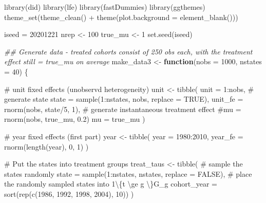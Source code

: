 \documentclass[
  letterpaper,
  DIV=11,
  numbers=noendperiod]{scrartcl}
\newenvironment{Shaded}{\begin{snugshade}}{\end{snugshade}}
\newcommand{\AttributeTok}[1]{\textcolor[rgb]{0.40,0.45,0.13}{#1}}
\newcommand{\CommentTok}[1]{\textcolor[rgb]{0.37,0.37,0.37}{#1}}
\newcommand{\ConstantTok}[1]{\textcolor[rgb]{0.56,0.35,0.01}{#1}}
\newcommand{\ControlFlowTok}[1]{\textcolor[rgb]{0.00,0.23,0.31}{\textbf{#1}}}
\newcommand{\DecValTok}[1]{\textcolor[rgb]{0.68,0.00,0.00}{#1}}
\newcommand{\DocumentationTok}[1]{\textcolor[rgb]{0.37,0.37,0.37}{\textit{#1}}}
\newcommand{\FunctionTok}[1]{\textcolor[rgb]{0.28,0.35,0.67}{#1}}
\newcommand{\NormalTok}[1]{\textcolor[rgb]{0.00,0.23,0.31}{#1}}
\newcommand{\OtherTok}[1]{\textcolor[rgb]{0.00,0.23,0.31}{#1}}
\newcommand{\SpecialCharTok}[1]{\textcolor[rgb]{0.37,0.37,0.37}{#1}}
\begin{document}
\begin{Shaded}
\begin{Highlighting}[]
\FunctionTok{library}\NormalTok{(did) }
\FunctionTok{library}\NormalTok{(lfe)}
\FunctionTok{library}\NormalTok{(fastDummies)}
\FunctionTok{library}\NormalTok{(ggthemes)}
\FunctionTok{theme\_set}\NormalTok{(}\FunctionTok{theme\_clean}\NormalTok{() }\SpecialCharTok{+} \FunctionTok{theme}\NormalTok{(}\AttributeTok{plot.background =} \FunctionTok{element\_blank}\NormalTok{()))}

\NormalTok{iseed }\OtherTok{=} \DecValTok{20201221}
\NormalTok{nrep }\OtherTok{\textless{}{-}} \DecValTok{100}
\NormalTok{true\_mu }\OtherTok{\textless{}{-}} \DecValTok{1}
\FunctionTok{set.seed}\NormalTok{(iseed)}

\DocumentationTok{\#\# Generate data {-} treated cohorts consist of 250 obs each, with the treatment effect still = true\_mu on average}
\NormalTok{make\_data3 }\OtherTok{\textless{}{-}} \ControlFlowTok{function}\NormalTok{(}\AttributeTok{nobs =} \DecValTok{1000}\NormalTok{, }
                      \AttributeTok{nstates =} \DecValTok{40}\NormalTok{) \{}
  
  \CommentTok{\# unit fixed effects (unobservd heterogeneity)}
\NormalTok{  unit }\OtherTok{\textless{}{-}} \FunctionTok{tibble}\NormalTok{(}
    \AttributeTok{unit =} \DecValTok{1}\SpecialCharTok{:}\NormalTok{nobs,}
    \CommentTok{\# generate state}
    \AttributeTok{state =} \FunctionTok{sample}\NormalTok{(}\DecValTok{1}\SpecialCharTok{:}\NormalTok{nstates, nobs, }\AttributeTok{replace =} \ConstantTok{TRUE}\NormalTok{),}
    \AttributeTok{unit\_fe =} \FunctionTok{rnorm}\NormalTok{(nobs, state}\SpecialCharTok{/}\DecValTok{5}\NormalTok{, }\DecValTok{1}\NormalTok{),}
    \CommentTok{\# generate instantaneous treatment effect}
    \CommentTok{\#mu = rnorm(nobs, true\_mu, 0.2)}
    \AttributeTok{mu =}\NormalTok{ true\_mu}
\NormalTok{  )}
  
  \CommentTok{\# year fixed effects (first part)}
\NormalTok{  year }\OtherTok{\textless{}{-}} \FunctionTok{tibble}\NormalTok{(}
    \AttributeTok{year =} \DecValTok{1980}\SpecialCharTok{:}\DecValTok{2010}\NormalTok{,}
    \AttributeTok{year\_fe =} \FunctionTok{rnorm}\NormalTok{(}\FunctionTok{length}\NormalTok{(year), }\DecValTok{0}\NormalTok{, }\DecValTok{1}\NormalTok{)}
\NormalTok{  )}
  
  \CommentTok{\# Put the states into treatment groups}
\NormalTok{  treat\_taus }\OtherTok{\textless{}{-}} \FunctionTok{tibble}\NormalTok{(}
    \CommentTok{\# sample the states randomly}
    \AttributeTok{state =} \FunctionTok{sample}\NormalTok{(}\DecValTok{1}\SpecialCharTok{:}\NormalTok{nstates, nstates, }\AttributeTok{replace =} \ConstantTok{FALSE}\NormalTok{),}
    \CommentTok{\# place the randomly sampled states into 1\textbackslash{}\{t \textbackslash{}ge g \textbackslash{}\}G\_g}
    \AttributeTok{cohort\_year =} \FunctionTok{sort}\NormalTok{(}\FunctionTok{rep}\NormalTok{(}\FunctionTok{c}\NormalTok{(}\DecValTok{1986}\NormalTok{, }\DecValTok{1992}\NormalTok{, }\DecValTok{1998}\NormalTok{, }\DecValTok{2004}\NormalTok{), }\DecValTok{10}\NormalTok{))}
\NormalTok{  )}
  

\end{Highlighting}
\end{Shaded}
\end{document}

